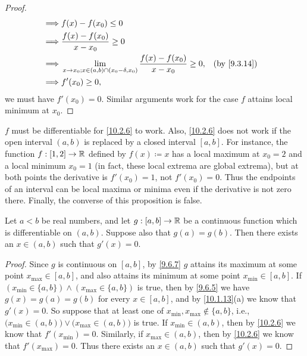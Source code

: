 \begin{proof}
\begin{align*}
    \implies & f(x) - f(x_0) \leq 0                                                                                             \\
    \implies & \dfrac{f(x) - f(x_0)}{x - x_0} \geq 0                                                                            \\
    \implies & \lim_{x \to x_0 ; x \in (a, b) \cap (x_0 - \delta, x_0)} \dfrac{f(x) - f(x_0)}{x - x_0} \geq 0, &  & \by{9.3.14} \\
    \implies & f'(x_0) \geq 0,
  \end{align*}
  we must have \(f'(x_0) = 0\).
  Similar arguments work for the case \(f\) attains local minimum at \(x_0\).
\end{proof}

\begin{note}
  \(f\) must be differentiable for \cref{10.2.6} to work.
  Also, \cref{10.2.6} does not work if the open interval \((a, b)\) is replaced by a closed interval \([a, b]\).
  For instance, the function \(f : [1, 2] \to \mathbb{R}\) defined by \(f(x) \coloneqq x\) has a local maximum at \(x_0 = 2\) and a local minimum \(x_0 = 1\) (in fact, these local extrema are global extrema), but at both points the derivative is \(f'(x_0) = 1\), not \(f'(x_0) = 0\).
  Thus the endpoints of an interval can be local maxima or minima even if the derivative is not zero there.
  Finally, the converse of this proposition is false.
\end{note}

\begin{thm}\label{10.2.7}
  Let \(a < b\) be real numbers, and let \(g : [a, b] \to \mathbb{R}\) be a continuous function which is differentiable on \((a, b)\).
  Suppose also that \(g(a) = g(b)\).
  Then there exists an \(x \in (a, b)\) such that \(g'(x) = 0\).
\end{thm}

\begin{proof}
  Since \(g\) is continuous on \([a, b]\), by \cref{9.6.7} \(g\) attains its maximum at some point \(x_{\max} \in [a, b]\), and also attains its minimum at some point \(x_{\min} \in [a, b]\).
  If \((x_{\min} \in \{a, b\}) \land (x_{\max} \in \{a, b\})\) is true, then by \cref{9.6.5} we have \(g(x) = g(a) = g(b)\) for every \(x \in [a, b]\), and by \cref{10.1.13}(a) we know that \(g'(x) = 0\).
  So suppose that at least one of \(x_{\min}, x_{\max} \notin \{a, b\}\), i.e., \(\big(x_{\min} \in (a, b)\big) \lor \big(x_{\max} \in (a, b)\big)\) is true.
  If \(x_{\min} \in (a, b)\), then by \cref{10.2.6} we know that \(f'(x_{\min}) = 0\).
  Similarly, if \(x_{\max} \in (a, b)\), then by \cref{10.2.6} we know that \(f'(x_{\max}) = 0\).
  Thus there exists an \(x \in (a, b)\) such that \(g'(x) = 0\).
\end{proof}


